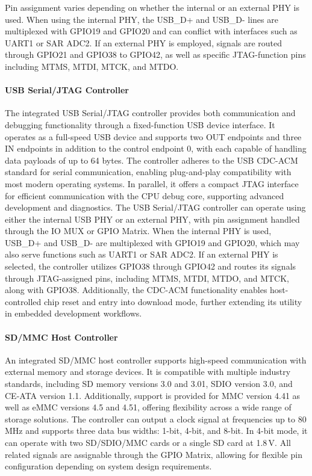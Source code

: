 Pin assignment varies depending on whether the internal or an external PHY is used. When using the internal PHY, the USB\_D+ and USB\_D- lines are multiplexed with GPIO19 and GPIO20 and can conflict with interfaces such as UART1 or SAR ADC2. If an external PHY is employed, signals are routed through GPIO21 and GPIO38 to GPIO42, as well as specific JTAG-function pins including MTMS, MTDI, MTCK, and MTDO.

\paragraph{USB Serial/JTAG Controller}
The integrated USB Serial/JTAG controller provides both communication and debugging functionality through a fixed-function USB device interface. It operates as a full-speed USB device and supports two OUT endpoints and three IN endpoints in addition to the control endpoint 0, with each capable of handling data payloads of up to 64 bytes. The controller adheres to the USB CDC-ACM standard for serial communication, enabling plug-and-play compatibility with most modern operating systems. In parallel, it offers a compact JTAG interface for efficient communication with the CPU debug core, supporting advanced development and diagnostics. The USB Serial/JTAG controller can operate using either the internal USB PHY or an external PHY, with pin assignment handled through the IO MUX or GPIO Matrix. When the internal PHY is used, USB\_D+ and USB\_D- are multiplexed with GPIO19 and GPIO20, which may also serve functions such as UART1 or SAR ADC2. If an external PHY is selected, the controller utilizes GPIO38 through GPIO42 and routes its signals through JTAG-assigned pins, including MTMS, MTDI, MTDO, and MTCK, along with GPIO38. Additionally, the CDC-ACM functionality enables host-controlled chip reset and entry into download mode, further extending its utility in embedded development workflows.

\paragraph{SD/MMC Host Controller}
An integrated SD/MMC host controller supports high-speed communication with external memory and storage devices. It is compatible with multiple industry standards, including SD memory versions 3.0 and 3.01, SDIO version 3.0, and CE-ATA version 1.1. Additionally, support is provided for MMC version 4.41 as well as eMMC versions 4.5 and 4.51, offering flexibility across a wide range of storage solutions. The controller can output a clock signal at frequencies up to 80\,MHz and supports three data bus widths: 1-bit, 4-bit, and 8-bit. In 4-bit mode, it can operate with two SD/SDIO/MMC cards or a single SD card at 1.8\,V. All related signals are assignable through the GPIO Matrix, allowing for flexible pin configuration depending on system design requirements.

